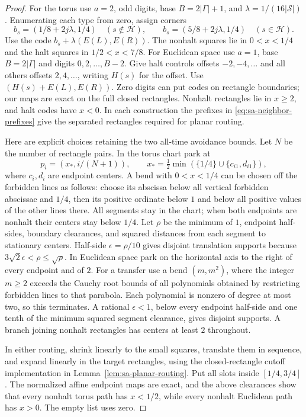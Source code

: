 \begin{proof}
For the torus use $a=2$, odd digits, base $B=2|\Gamma|+1$, and
$\lambda=1/(16|\mathcal S|)$.  Enumerating each type from zero, assign
corners
\[
 b_s=(1/8+2j\lambda,1/4)\quad(s\notin\mathcal H),\qquad
 b_s=(5/8+2j\lambda,1/4)\quad(s\in\mathcal H).
\]
Use the code $b_s+\lambda(E(L),E(R))$.
The nonhalt squares lie in $0<x<1/4$ and the halt squares in
$1/2<x<7/8$.  For Euclidean space use $a=1$, base $B=2|\Gamma|$ and
digits $0,2,\ldots,B-2$.  Give halt controls offsets $-2,-4,\ldots$
and all others offsets $2,4,\ldots$, writing $H(s)$ for the offset.
Use $(H(s)+E(L),E(R))$.  Zero digits can put codes on rectangle boundaries;
our maps are exact on the full closed rectangles.  Nonhalt rectangles
lie in $x\ge2$, and halt codes have $x<0$.
In each construction the prefixes in \eqref{eq:sa-neighbor-prefixes}
give the separated rectangles required for planar routing.

Here are explicit choices retaining the two all-time avoidance bounds.
Let $N$ be the number of rectangle pairs.  In the torus chart park at
\[
 p_i=(x_*,i/(N+1)),\qquad
 x_*={\tfrac12}\min(\{1/4\}\cup\{c_{i1},d_{i1}\}),
\]
where $c_i,d_i$ are endpoint centers.  A bend with $0<x<1/4$ can be
chosen off the forbidden lines as follows: choose its abscissa below
all vertical forbidden abscissae and $1/4$, then its positive ordinate
below $1$ and below all positive values of the other lines there.
All segments stay in the chart; when both endpoints are nonhalt their
centers stay below $1/4$.  Let $\rho$ be the minimum of $1$, endpoint
half-sides, boundary clearances, and squared distances from each segment
to stationary centers.  Half-side $\epsilon=\rho/10$ gives disjoint
translation supports because $3\sqrt2\epsilon<\rho\le\sqrt\rho$.
In Euclidean space park on the horizontal axis to the right of every
endpoint and of $2$.  For a transfer use a bend $(m,m^2)$, where the
integer $m\ge2$ exceeds the Cauchy root bounds of all polynomials obtained
by restricting forbidden lines to that parabola.  Each polynomial is
nonzero of degree at most two, so this terminates.  A rational
$\epsilon<1$, below every endpoint half-side and one tenth of the
minimum squared segment clearance, gives disjoint supports.  A branch
joining nonhalt rectangles has centers at least $2$ throughout.

In either routing, shrink linearly to the small squares, translate them
in sequence, and expand linearly in the target rectangles, using the
closed-rectangle cutoff implementation in
Lemma~\ref{lem:sa-planar-routing}.  Put all slots inside $[1/4,3/4]$.
The normalized affine endpoint maps are exact, and the above clearances
show that every nonhalt torus path has $x<1/2$, while every nonhalt
Euclidean path has $x>0$.  The empty list uses zero.


\end{proof}
